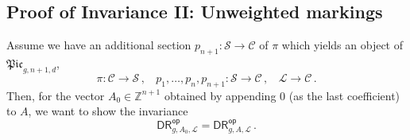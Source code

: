 \documentclass[a4paper,12pt]{article} %
\def\P{\mathsf{P}}
\theoremstyle{definition}
\theoremstyle{plain}%
\newcommand{\Picabs}{\mathfrak{Pic}}
\newcommand{\invnrn}{II}
\begin{document}

\subsection{Proof of Invariance \invnrn{}: {\rm Unweighted markings}}
Assume we have an additional section $p_{n+1}: \mathcal{S} \rightarrow \mathcal{C}$ of $\pi$ which yields an object of $\Picabs_{g,n+1,d}$,
    \begin{equation}
    \label{ff44996}    
    \pi:\mathcal{C} \rightarrow \mathcal{S}\, , \ \ \ \ p_1,\ldots,p_n,p_{n+1}: \mathcal{S} \rightarrow \mathcal{C}\, , \ \ \ \
        \mathcal{L} \rightarrow \mathcal{C}\, .
        \end{equation}
 Then, for the vector $A_0 \in \mathbb{Z}^{n+1}$ obtained by appending $0$ (as the last coefficient) to $A$, we want to show the invariance
 \begin{equation} \label{eqn:n_invar_repeat}
     \mathsf{DR}^{\mathsf{op}}_{g,A_0, \mathcal{L}}
        =\mathsf{DR}^{\mathsf{op}}_{g,A, \mathcal{L}}
        \, .
 \end{equation}
\end{document}
